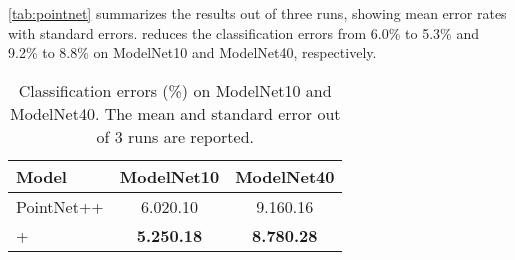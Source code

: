 \documentclass[final]{cvpr}
\begin{document}
\autoref{tab:pointnet} summarizes the results out of three runs, showing mean error rates with standard errors.  \methodname{} reduces the classification errors from 6.0\% to 5.3\% and 9.2\% to 8.8\% on ModelNet10 and ModelNet40, respectively. 


\begin{table}[h]
    \centering
    \begin{tabular}{l|c|c}
    \toprule
    Model & ModelNet10 & ModelNet40 \\
    \midrule
    \midrule
    PointNet++ & 6.020.10 & 9.160.16\\
    + \methodname{} & \textbf{5.250.18 }& \textbf{8.780.28}\\
    \bottomrule
\end{tabular}
\caption{Classification errors (\%) on ModelNet10 and ModelNet40. The mean and standard error out of 3 runs are reported.}
\label{tab:pointnet}     \vspace{-0.2in}
\end{table}









 






{\small


}

\clearpage
\appendix

\end{document}
